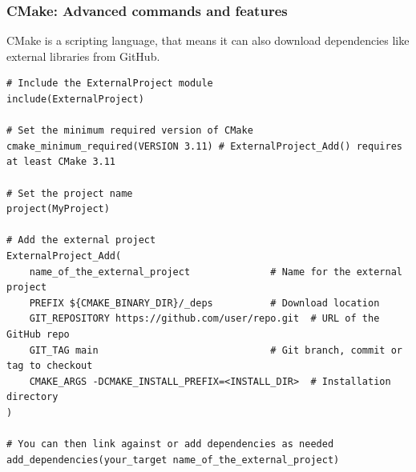 \documentclass{beamer}
\begin{document}
\begin{frame}[fragile]
\frametitle{CMake: Advanced commands and features}
CMake is a scripting language, that means it can also download dependencies like external libraries from GitHub. \\
\tiny
\begin{verbatim}
# Include the ExternalProject module
include(ExternalProject)

# Set the minimum required version of CMake
cmake_minimum_required(VERSION 3.11) # ExternalProject_Add() requires at least CMake 3.11

# Set the project name
project(MyProject)

# Add the external project
ExternalProject_Add(
    name_of_the_external_project              # Name for the external project
    PREFIX ${CMAKE_BINARY_DIR}/_deps          # Download location
    GIT_REPOSITORY https://github.com/user/repo.git  # URL of the GitHub repo
    GIT_TAG main                              # Git branch, commit or tag to checkout
    CMAKE_ARGS -DCMAKE_INSTALL_PREFIX=<INSTALL_DIR>  # Installation directory
)

# You can then link against or add dependencies as needed
add_dependencies(your_target name_of_the_external_project)
\end{verbatim}
\end{frame}
\end{document}
